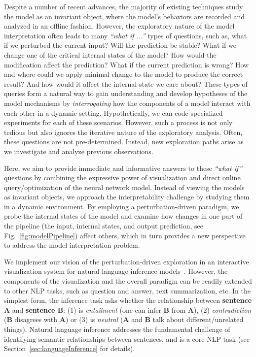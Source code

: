 Despite a number of recent advances, the majority of existing techniques study the model as an invariant object, where the model's behaviors are recorded and analyzed in an offline fashion.
%
However, the exploratory nature of the model interpretation often leads to many \emph{``what if ...''} types of questions, 
such as, what if we perturbed the current input?
Will the prediction be stable?
What if we change one of the critical internal states of the model? 
How would the modification affect the prediction? 
What if the current prediction is wrong? 
How and where could we apply minimal change to the model to produce the correct result? And how would it affect the internal state we care about? These types of queries form a natural way to gain understanding and develop hypotheses of the model mechanisms by \emph{interrogating} how the components of a model interact with each other in a dynamic setting.
Hypothetically, we can code specialized experiments for each of these scenarios.
However, such a process is not only tedious but also ignores the iterative nature of the exploratory analysis. Often, these questions are not pre-determined.
Instead, new exploration paths arise as we investigate and analyze previous observations.

Here, we aim to provide immediate and informative answers to these \emph{``what if''} questions by combining the expressive power of visualization and direct online query/optimization of the neural network model. Instead of viewing the models as invariant objects, we approach the interpretability challenge by studying them in a dynamic environment. By employing a perturbation-driven paradigm, we probe the internal states of the model and examine how changes in one part of the pipeline (the input, internal states, and output prediction, see Fig.~\ref{fig:modelPipeline}) affect others, which in turn provides a new perspective to address the model interpretation problem.

We implement our vision of the perturbation-driven exploration in an interactive visualization system for natural language inference models~\cite{Parikh2016}.
However, the components of the visualization and the overall paradigm can be readily extended to other NLP tasks, such as question and answer, text summarization, etc.
%
In the simplest form, the inference task asks whether the
relationship between \textbf{sentence A} and \textbf{sentence B}: (1) is \emph{entailment} (one can infer \textbf{B} from \textbf{A}), (2) \emph{contradiction} (\textbf{B} disagrees with \textbf{A}) or (3) is \emph{neutral} (\textbf{A} and \textbf{B} talk about different/unrelated things).
Natural language inference addresses the fundamental challenge of identifying semantic relationships between sentences, and is a core NLP task (see Section~\ref{sec:languageInference} for details).

